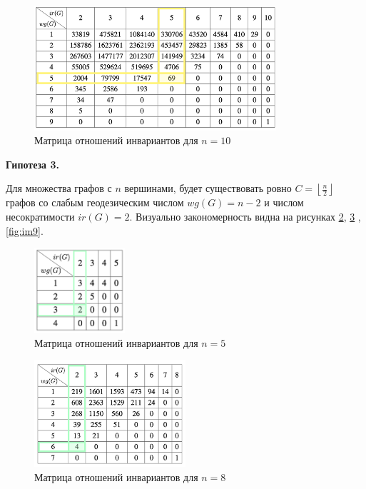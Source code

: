\documentclass[bachelor, och, nir]{SCWorks}
\begin{document}
\begin{figure} 
    \centering 
    \includegraphics[width=0.8\textwidth]
{Group428.png}  
    \caption{Матрица отношений инвариантов для $n = 10$} 
    \label{fig:im6} 
\end{figure}

\newpage
\textbf{Гипотеза 3.}

Для множества графов с $n$ вершинами, будет существовать ровно $C =\left\lfloor \displaystyle \frac{n}{2} \right\rfloor$ графов со слабым геодезическим числом $wg(G) = n-2$ и числом несократимости $ir(G) = 2$. Визуально закономерность видна на рисунках
\ref{fig:im7}, \ref{fig:im8} , \ref{fig:im9}.



\begin{figure}[ht!]  
    \centering 
    \includegraphics[width=0.3\textwidth]
{Group429.png}  
    \caption{Матрица отношений инвариантов для $n = 5$} 
    \label{fig:im7} 
\end{figure}
\FloatBarrier

\begin{figure}[ht!]  
    \centering 
    \includegraphics[width=0.5\textwidth]
    {Group430.png}  
    \caption{Матрица отношений инвариантов для $n = 8$} 
    \label{fig:im8} 
\end{figure}
\FloatBarrier
\end{document}
